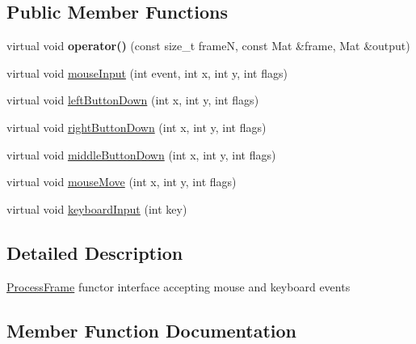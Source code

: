 \subsection*{Public Member Functions}
\begin{DoxyCompactItemize}
\item 
virtual void {\bfseries operator()} (const size\+\_\+t frameN, const Mat \&frame, Mat \&output)\hypertarget{classviva_1_1_process_frame_a82b5b1de63b91ce06fef1eff2d3fdf1e}{}\label{classviva_1_1_process_frame_a82b5b1de63b91ce06fef1eff2d3fdf1e}

\item 
virtual void \hyperlink{classviva_1_1_process_frame_a67f1444128085a4f18b6c7fe5086e6fc}{mouse\+Input} (int event, int x, int y, int flags)
\item 
virtual void \hyperlink{classviva_1_1_process_frame_a1d0476b4a6065fae4c0b46abf230be1c}{left\+Button\+Down} (int x, int y, int flags)
\item 
virtual void \hyperlink{classviva_1_1_process_frame_a03b8c90d990dcefdddf4ad735290d0eb}{right\+Button\+Down} (int x, int y, int flags)
\item 
virtual void \hyperlink{classviva_1_1_process_frame_a2c5155855fa6a88bb8124278ece845ee}{middle\+Button\+Down} (int x, int y, int flags)
\item 
virtual void \hyperlink{classviva_1_1_process_frame_a075654580641032ff792eedd3fd6b7a1}{mouse\+Move} (int x, int y, int flags)
\item 
virtual void \hyperlink{classviva_1_1_process_frame_a56d6805a983de9072ce31ea60688a408}{keyboard\+Input} (int key)
\end{DoxyCompactItemize}


\subsection{Detailed Description}
\hyperlink{classviva_1_1_process_frame}{Process\+Frame} functor interface accepting mouse and keyboard events 

\subsection{Member Function Documentation}

